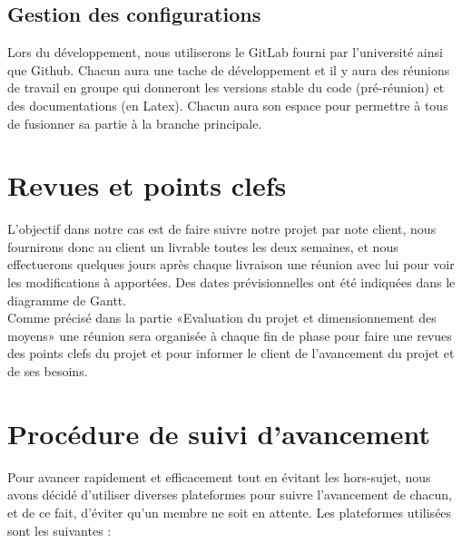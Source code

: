 		\section{Gestion des configurations}
		Lors du développement, nous utiliserons le GitLab fourni par l’université ainsi que Github. Chacun
		aura une tache de développement et il y aura des réunions de travail en groupe qui donneront les versions
		stable du code (pré-réunion) et des documentations (en Latex). Chacun aura son espace pour
		permettre à tous de fusionner sa partie à la branche principale.



\chapter{Revues et points clefs}

L'objectif dans notre cas est de faire suivre notre projet par note client,
nous fournirons donc au client un livrable toutes les deux semaines, et nous effectuerons
quelques jours après chaque livraison une réunion avec lui pour voir les modifications à
apportées. Des dates prévisionnelles ont été indiquées dans le diagramme de Gantt.\\

Comme précisé dans la partie «Evaluation du projet et dimensionnement des moyens» une réunion sera organisée à chaque fin de phase pour faire 
une revues des points clefs du projet et pour informer le client de l'avancement du projet et de ses besoins.

\chapter{Procédure de suivi d'avancement}

Pour avancer rapidement et efficacement tout en évitant les hors-sujet, nous avons
décidé d’utiliser diverses plateformes pour suivre l’avancement de chacun, et de ce fait,
d’éviter qu’un membre ne soit en attente. Les plateformes utilisées sont les suivantes :\\ \newline

